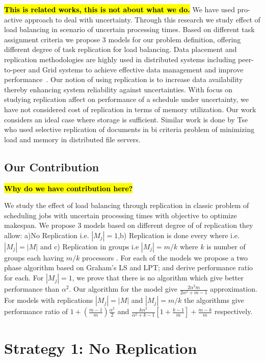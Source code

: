 \documentclass[10pt, conference, compsocconf]{IEEEtran}
\newcommand{\todo}[1]{{\color{red}\textbf{\hl{#1}}\xspace}}
\begin{document}
\todo{This is related works, this is not about what we do.} We have
used pro-active approach to deal with uncertainty. Through this
research we study effect of load balancing in scenario of uncertain
processing times. Based on different task assignment criteria we
propose 3 models for our problem definition, offering different degree
of task replication for load balancing. Data placement and replication
methodologies are highly used in distributed systems including
peer-to-peer and Grid systems to achieve effective data management and
improve
performance~\cite{Cirne2007213}\cite{Abawajy}\cite{4215379}. Our
notion of using replication is to increase data availability thereby
enhancing system reliability against uncertainties. With focus on
studying replication affect on performance of a schedule under
uncertainty, we have not considered cost of replication in terms of
memory utilization. Our work considers an ideal case where storage is
sufficient.  Similar work is done by Tse~\cite{DBLP:journals/tc/Tse12}
who used selective replication of documents in bi criteria problem of
minimizing load and memory in distributed file servers.


\subsection{Our Contribution}

\todo{Why do we have contribution here?}

We study the effect of load balancing through replication in classic
problem of scheduling jobs with uncertain processing times with
objective to optimize makespan. We propose 3 models based on different
degree of of replication they allow: a)No Replication i.e. $|M_j|=1
$,b) Replication is done every where i.e.$|M_j|=|M|$ and c)
Replication in groups i.e $|M_j|= m/k$ where $k$ is number of groups
each having $m/k$ processors . For each of the models we propose a two
phase algorithm based on Graham's LS and LPT; and derive performance
ratio for each. For $|M_j|=1 $, we prove that there is no algorithm
which give better performance than $\alpha^2$. Our algorithm for the
model give $\frac{2\alpha^{2}m}{2\alpha^{2}+ m-1}$ approximation. For
models with replications $|M_j|=|M|$ and $|M_j|= m/k$ the algorithms
give performance ratio of $ 1 + (\frac{m-1}{m})\frac{\alpha^{2}}{2}$
and $\frac{k\alpha^{2}}{\alpha^{2}+k-1}\left[1+ {\frac{k-1}{m}}
\right]+ {\frac{m-k}{m}}$ respectively.

\section{Strategy 1: No Replication}\label{sec4}
\end{document}
